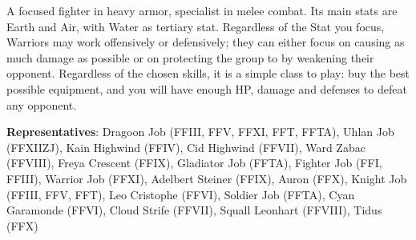 \begin{jobdesc}[name=pjob-warrior]
    A focused fighter in heavy armor, specialist in melee combat. Its main stats are Earth and Air, with Water as tertiary stat. Regardless of the Stat you focus, Warriors may work offensively or defensively; they can either focus on causing as much damage as possible or on protecting the group to by weakening their opponent. Regardless of the chosen skills, it is a simple class to play: buy the best possible equipment, and you will have enough HP, damage and defenses to defeat any opponent. \pc%

    \textbf{Representatives}: Dragoon Job (FFIII, FFV, FFXI, FFT, FFTA), Uhlan Job (FFXIIZJ), Kain Highwind (FFIV), Cid Highwind (FFVII), Ward Zabac (FFVIII), Freya Crescent (FFIX), Gladiator Job (FFTA), Fighter Job (FFI, FFIII), Warrior Job (FFXI), Adelbert Steiner (FFIX), Auron (FFX), Knight Job (FFIII, FFV, FFT), Leo Cristophe (FFVI), Soldier Job (FFTA), Cyan Garamonde (FFVI), Cloud Strife (FFVII), Squall Leonhart (FFVIII), Tidus (FFX) \pc%

    \jobstats[hpa=5x,hpb=6x,hpc=7x,hpd=8x,mpa=0x,mpc=1x,armor=Heavy,weapons=Light Sword/ Knives \\ Claws / Gloves \\ Weapons \& Shields \\ Heavy Weapon \\ Katanas \\ Polearms]
\end{jobdesc}

